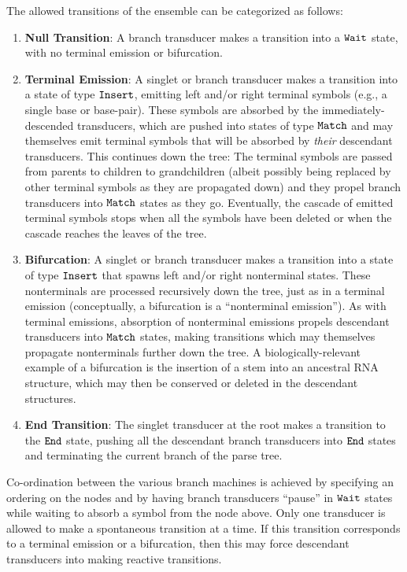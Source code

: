 \documentclass[10pt]{article}
\begin{document}
The allowed transitions of the ensemble can be categorized as follows:
\begin{enumerate}
\item {\bf Null Transition}:
  A branch transducer makes a transition into a $\mathtt{Wait}$ state, with no terminal emission or bifurcation.
\item {\bf Terminal Emission}:
  A singlet or branch transducer makes a transition into a state of type $\mathtt{Insert}$,
  emitting left and/or right terminal symbols (e.g., a single base or base-pair).
  These symbols are absorbed by the immediately-descended transducers,
  which are pushed into states of type $\mathtt{Match}$
  and may themselves emit terminal symbols
  that will be absorbed by {\em their} descendant transducers.
  This continues down the tree: The terminal symbols are passed from parents to children to grandchildren
  (albeit possibly being replaced by other terminal symbols as they
  are propagated down)
  and they propel branch transducers into $\mathtt{Match}$ states as they go.
  Eventually, the cascade of emitted terminal symbols stops when all the symbols have been deleted
  or when the cascade reaches the leaves of the tree.
\item {\bf Bifurcation}:
  A singlet or branch transducer makes a transition into a state of type $\mathtt{Insert}$ that spawns
  left and/or right nonterminal states.
  These nonterminals are processed recursively down the tree, just as in a
  terminal emission (conceptually, a bifurcation is a ``nonterminal emission'').
  As with terminal emissions, absorption of nonterminal emissions propels
  descendant transducers into $\mathtt{Match}$ states,
  making transitions which may themselves propagate nonterminals
  further down the tree.
  A biologically-relevant example of a bifurcation is the insertion of a stem
  into an ancestral RNA structure,
  which may then be conserved or deleted in the descendant structures.
\item {\bf End Transition}:
  The singlet transducer at the root makes a transition to the $\mathtt{End}$ state,
  pushing all the descendant branch transducers into $\mathtt{End}$ states and
  terminating the current branch of the parse tree.
\end{enumerate}

Co-ordination between the various branch machines is achieved by
specifying an ordering on the nodes and by having branch transducers ``pause'' in $\mathtt{Wait}$
states while waiting to absorb a symbol from the node above.  
Only one transducer is allowed to make a spontaneous transition at a
time. If this transition corresponds to a terminal
emission or a bifurcation, then this may force descendant transducers
into making reactive transitions.
\end{document}
